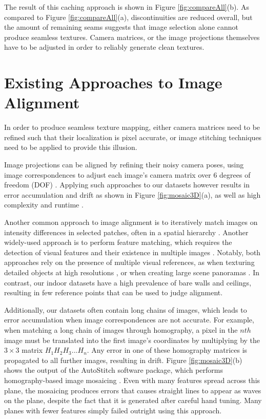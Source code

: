 \documentclass[10pt,twocolumn,letterpaper]{article}
\begin{document}
The result of this caching approach is shown in Figure
\ref{fig:compareAll}(b). As compared to Figure
\ref{fig:compareAll}(a), discontinuities are reduced overall, but the
amount of remaining seams suggests that image selection alone cannot
produce seamless textures. Camera matrices, or the image projections
themselves have to be adjusted in order to reliably generate clean
textures.

\section{Existing Approaches to Image Alignment}
\label{sec:existingApproaches}
In order to produce seamless texture mapping, either camera matrices
need to be refined such that their localization is pixel accurate, or
image stitching techniques need to be applied to provide this
illusion.

Image projections can be aligned by refining their noisy camera poses,
using image correspondences to adjust each image's camera matrix over
6 degrees of freedom (DOF) \cite{coorg1997matching, liu2010indoor,
  shum2000systems, szeliski1997creating}. Applying such approaches to
our datasets however results in error accumulation and drift as shown
in Figure \ref{fig:mosaic3D}(a), as well as high complexity and
runtime \cite{liu2010indoor}.

Another common approach to image alignment is to
iteratively match images on intensity differences in selected patches,
often in a spatial hierarchy \cite{hager1998efficient,
  lucas1981iterative, shum2000systems, szeliski2006image}. Another
widely-used approach is to perform feature matching, which requires
the detection of visual features and their existence in multiple
images \cite{brown2007automatic, cho2003automatic,
  mikolajczyk2005performance, szeliski2006image,
  yun2003comprehensive}. Notably, both approaches rely on the presence
of multiple visual references, as when texturing detailed objects at
high resolutions \cite{bernardinimultiplescans, wangmultipleviews}, or
when creating large scene panoramas \cite{agarwalapanoramas,
  bernardinimultiplescans, debevecviewdependent,
  snavelyphototourism}. In contrast, our indoor datasets have a high
prevalence of bare walls and ceilings, resulting in few reference
points that can be used to judge alignment.

Additionally, our datasets often contain long chains of images, which
leads to error accumulation when image correspondences are not
accurate. For example, when matching a long chain of images through
homography, a pixel in the $nth$ image must be translated into the
first image's coordinates by multiplying by the $3\times3$ matrix $H_1
H_2 H_3 ... H_n$. Any error in one of these homography matrices is
propagated to all further images, resulting in drift. Figure
\ref{fig:mosaic3D}(b) shows the output of the AutoStitch software
package, which performs homography-based image mosaicing
\cite{autostitch}. Even with many features spread across this plane,
the mosaicing produces errors that causes straight lines to appear as
waves on the plane, despite the fact that it is generated after
careful hand tuning. Many planes with fewer features simply failed
outright using this approach.
\end{document}
